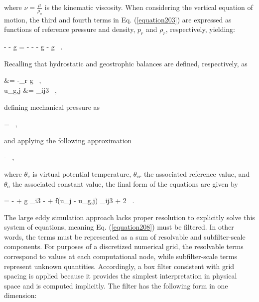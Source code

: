 \noindent where $\nu = \frac{\mu}{\rho_o}$ is the kinematic viscosity. When considering the vertical equation of motion, the third and fourth terms in Eq. (\autoref{equation203}) are expressed as functions of reference pressure and density, $p_r$ and $\rho_r$, respectively, yielding:


\be
-   -  g = -   -   -   g -  g \mbox{ .}
\label{equation204}
\ee


\noindent Recalling that hydrostatic and geostrophic balances are defined, respectively, as


\bse \label{equation205}
\bal
{} &= -\rho_r g \mbox{ ,} \label{equation205a}\\
u_{g,j} &= \epsilon_{ij3}    \label{equation205b} \mbox{ ,}
\eal
\ese


\noindent defining mechanical pressure as

\be
\pi =  \mbox{ ,}
\label{equation206}
\ee

\noindent and applying the following approximation


\be
- \approx {} \mbox{ ,}
\label{equation207}
\ee


\noindent where $\theta_v$ is virtual potential temperature, $\theta_{vr}$ the associated reference value, and $\theta_o$ the associated constant value, the final form of the equations are given by

 
\be
{} = - + g  \delta_{i3} -  + f(u_j - u_{g,j}) \epsilon_{ij3} + 2 \nu {} \mbox{ .}
\label{equation208}
\ee


The large eddy simulation approach lacks proper resolution to explicitly solve this system of equations, meaning Eq. (\autoref{equation208}) must be filtered. In other words, the terms must be represented as a sum of resolvable and subfilter-scale components. For purposes of a discretized numerical grid, the resolvable terms correspond to values at each computational node, while subfilter-scale terms represent unknown quantities. Accordingly, a box filter consistent with grid spacing is applied because it provides the simplest interpretation in physical space and is computed implicitly. The filter has the following form in one dimension:


